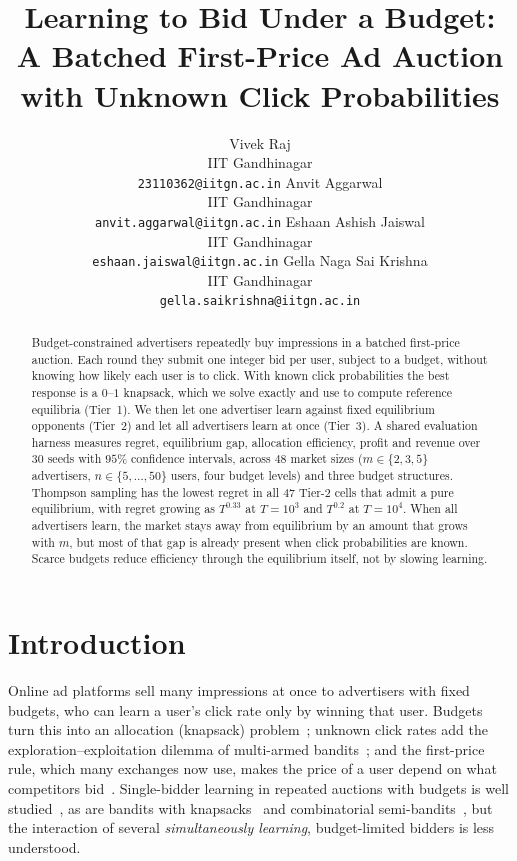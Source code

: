 \documentclass{article}
\title{Learning to Bid Under a Budget: A Batched First-Price Ad Auction with Unknown Click Probabilities}
\author{
  Vivek Raj \\ IIT Gandhinagar \\ \texttt{23110362@iitgn.ac.in} \And
  Anvit Aggarwal \\ IIT Gandhinagar \\ \texttt{anvit.aggarwal@iitgn.ac.in} \And
  Eshaan Ashish Jaiswal \\ IIT Gandhinagar \\ \texttt{eshaan.jaiswal@iitgn.ac.in} \And
  Gella Naga Sai Krishna \\ IIT Gandhinagar \\ \texttt{gella.saikrishna@iitgn.ac.in}
}
\date{}
\theoremstyle{definition}
\begin{document}
\maketitle

\begin{abstract}
Budget-constrained advertisers repeatedly buy impressions in a batched first-price auction. Each round
they submit one integer bid per user, subject to a budget, without knowing how likely each user is to
click. With known click probabilities the best response is a $0$--$1$ knapsack, which we solve exactly
and use to compute reference equilibria (Tier~1). We then let one advertiser learn against fixed
equilibrium opponents (Tier~2) and let all advertisers learn at once (Tier~3). A shared evaluation
harness measures regret, equilibrium gap, allocation efficiency, profit and revenue over $30$ seeds with
$95\%$ confidence intervals, across $48$ market sizes ($m\in\{2,3,5\}$ advertisers, $n\in\{5,\dots,50\}$
users, four budget levels) and three budget structures. Thompson sampling has the lowest regret in all
$47$ Tier-2 cells that admit a pure equilibrium, with regret growing as $T^{0.33}$ at $T=10^3$ and
$T^{0.2}$ at $T=10^4$. When all advertisers learn, the market stays away from equilibrium by an amount
that grows with $m$, but most of that gap is already present when click probabilities are known.
Scarce budgets reduce efficiency through the equilibrium itself, not by slowing learning.
\end{abstract}


\section{Introduction}\label{sec:intro}
Online ad platforms sell many impressions at once to advertisers with fixed budgets, who can learn a
user's click rate only by winning that user. Budgets turn this into an allocation
(knapsack) problem~\citep{kellerer2004knapsack}; unknown click rates add the exploration--exploitation
dilemma of multi-armed bandits~\citep{auer2002finite,lattimore2020bandit}; and the first-price rule,
which many exchanges now use, makes the price of a user depend on what competitors bid~\citep{krishna2009auction}.
Single-bidder learning in repeated auctions with budgets is well studied~\citep{balseiro2019learning,han2020optimal},
as are bandits with knapsacks~\citep{badanidiyuru2013bandits} and combinatorial semi-bandits~\citep{chen2013combinatorial},
but the interaction of several \emph{simultaneously learning}, budget-limited bidders is less understood.
\end{document}
